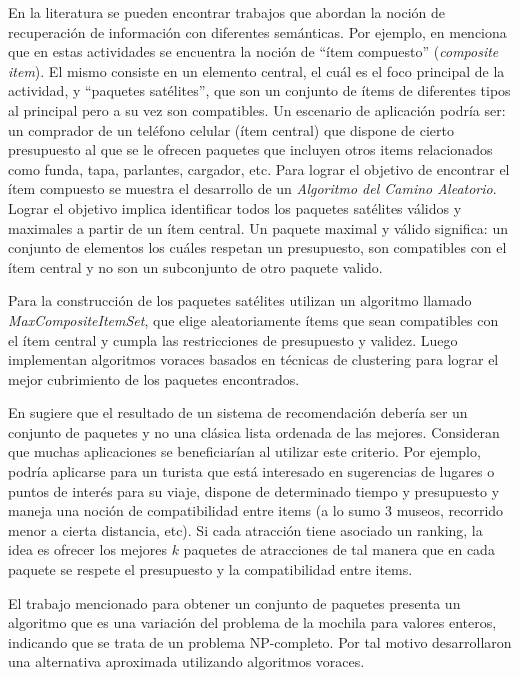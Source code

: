 En la literatura se pueden encontrar trabajos que abordan la noción de recuperación de información con diferentes semánticas. Por ejemplo, en \cite{BasuRoy:2010:CEC:1807167.1807258} menciona que en estas actividades se encuentra la noción de ``ítem compuesto'' (\textit{composite item}). El mismo consiste en un elemento central, el cuál es el foco principal de la actividad, y ``paquetes satélites'', que son un conjunto de ítems de diferentes tipos al principal pero a su vez son compatibles. Un escenario de aplicación podría ser: un comprador de un teléfono celular (ítem central) que dispone de cierto presupuesto al que se le ofrecen paquetes que incluyen otros items relacionados como funda, tapa, parlantes, cargador, etc. Para lograr el objetivo de encontrar el ítem compuesto se muestra el desarrollo de un {\em Algoritmo del Camino Aleatorio}. Lograr el objetivo implica identificar todos los paquetes satélites válidos y maximales a partir de un ítem central. Un paquete maximal y válido significa: un conjunto de elementos los cuáles respetan un presupuesto, son compatibles con el ítem central y no son un subconjunto de otro paquete valido. 

Para la construcción de los paquetes satélites utilizan un algoritmo llamado {\em MaxCompositeItemSet}, que elige aleatoriamente ítems que sean compatibles con el ítem central y cumpla las restricciones de presupuesto y validez. Luego implementan algoritmos voraces basados en técnicas de clustering para lograr el mejor cubrimiento de los paquetes encontrados.

En \cite{Xie:2010:BOB:1864708.1864739} sugiere que el resultado de un sistema de recomendación debería ser un conjunto de paquetes y no una clásica lista ordenada de las mejores. Consideran que muchas aplicaciones se beneficiarían al utilizar este criterio. Por ejemplo, podría aplicarse para un turista que está interesado en sugerencias de lugares o puntos de interés para su viaje, dispone de determinado tiempo y presupuesto y maneja una noción de compatibilidad entre items (a lo sumo 3 museos, recorrido menor a cierta distancia, etc). Si cada atracción tiene asociado un ranking, la idea es ofrecer los mejores $k$ paquetes de atracciones de tal manera que en cada paquete se respete el presupuesto y la compatibilidad entre items.

El trabajo mencionado para obtener un conjunto de paquetes presenta un algoritmo que es una variación del problema de la mochila para valores enteros, indicando que se trata de un problema NP-completo. Por tal motivo desarrollaron una alternativa aproximada utilizando algoritmos voraces. 

